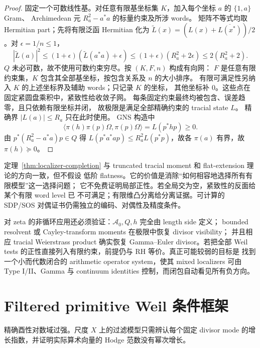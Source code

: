 \documentclass[UTF8,11pt,a4paper]{ctexart}
\theoremstyle{definition}
\theoremstyle{remark}
\newcommand{\1}{\mathbf 1}
\newcommand{\cA}{\mathcal A}
\begin{document}
\begin{proof}
固定一个可数线性基。对任意有限基坐标集 $K$，加入每个坐标 $a$ 的 $\{1,a\}$ Gram、
Archimedean 元 $R_a^2-a^*a$ 的标量约束及所涉 words。
矩阵不等式均取 Hermitian part；先将有限泛函 Hermitian 化为
$\widetilde L(x)=(L(x)+\overline{L(x^*)})/2$。对 $\epsilon=1/n\le1$，
\[
|\widetilde L(a)|^2\le(1+\epsilon)(\widetilde L(a^*a)+\epsilon)
\le(1+\epsilon)(R_a^2+2\epsilon)\le2(R_a^2+2).
\]
$Q$ 未必可数，故不使用可数约束穷尽。按 $(K,F,n)$ 构成有向网：
$F$ 是任意有限约束集，$K$ 包含其全部基坐标，按包含关系及 $n$ 的大小排序。
有限可满足性另纳入 $K$ 的上述坐标界及辅助 words；只记录 $K$ 的坐标，
其他坐标补 $0$。这些点在固定紧圆盘乘积中，紧致性给收敛子网。
每条固定约束最终均被包含、误差趋零，且只依赖有限坐标并闭，
故极限是满足全部精确约束的 tracial state $L$。
精确界 $|L(a)|\le R_a$ 只在此时使用。
GNS 构造中
\[
 \langle\pi(h)\pi(p)\Omega,\pi(p)\Omega\rangle=L(p^*hp)\ge0.
\]
由 $p^*(R_a^2-a^*a)p\in Q$ 得 $L(p^*a^*ap)\le R_a^2L(p^*p)$，故各 $\pi(a)$ 有界，故 $\pi(h)\succeq0$。
\end{proof}

定理~\ref{thm:localizer-completion} 与 truncated tracial moment 和
flat-extension 理论的方向一致\cite{BurgdorfKlep,MourrainSchmudgen}，但不假设
低阶 flatness。它的价值是消除“如何相容地选择所有有限模型”这一选择问题；
它不免费证明局部正性。若全局交为空，紧致性的反面给某个有限 word level 已
不可满足；有限维凸分离给分离证据。可计算的 SDP/SOS 对偶证书仍需独立的编码、对偶性及精度条件。

对 zeta 的非循环应用还必须验证：$\cA_0,Q,h$ 完全由 length side 定义；
bounded resolvent 或 Cayley-transform moments 在极限中恢复 divisor visibility；
并且相应 tracial Weierstrass product 确实恢复 Gamma--Euler divisor。若把全部
Weil tests 的正性直接列入有限约束，前提仍与 RH 等价。真正可能较弱的目标是
找到一个小而代数闭合的 arithmetic operator system，使其 mixed localizers
可由 Type I/II、Gamma 与 continuum identities 控制，而闭包自动看见所有负方向。

\section{Filtered primitive Weil 条件框架}

精确酉性对数域过强。尺度 $X$ 上的过滤模型只需辨认每个固定 divisor mode 的增长指数，并证明实际算术向量的 Hodge 范数没有幂次增长。
\end{document}
